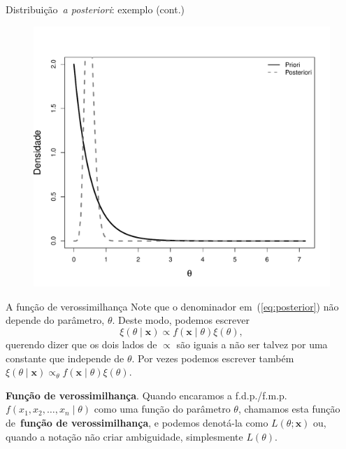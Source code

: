 \begin{frame}{Distribuição~\textit{a posteriori}: exemplo (cont.)}
    \begin{figure}[!ht]
    \label{fig:posterior_componentes}
    \begin{center}
    \includegraphics[scale=0.4]{figures/posterior_componentes.pdf} 
    \end{center} 
    \end{figure} 
\end{frame}
\begin{frame}{A função de verossimilhança}
 Note que o denominador em~(\ref{eq:posterior}) não depende do parâmetro, $\theta$.
 Deste modo, podemos escrever
 \[ \xi(\theta \mid \boldsymbol{x}) \propto f(\boldsymbol{x} \mid \theta)\xi(\theta), \]
 querendo dizer que os dois lados de $\propto$ são iguais a não ser talvez por uma constante que independe de $\theta$.
 Por vezes podemos escrever também $\xi(\theta \mid \boldsymbol{x}) \propto_\theta f(\boldsymbol{x} \mid \theta)\xi(\theta)$.
 \begin{defn}
  \textbf{Função de verossimilhança}. 
  Quando encaramos a f.d.p./f.m.p. $f(x_1, x_2, \ldots, x_n \mid \theta)$ como uma função do parâmetro $\theta$, chamamos esta função de~\textbf{função de verossimilhança}, e podemos denotá-la como $L(\theta ; \boldsymbol{x})$ ou, quando a notação não criar ambiguidade, simplesmente $L(\theta)$.
 \end{defn}
\end{frame}
